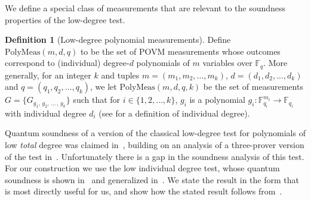 \documentclass[11pt]{article}
\theoremstyle{definition}
\newtheorem{definition}[theorem]{Definition}
\newcommand{\F}{\ensuremath{\mathbb{F}}}
\newcommand{\ldc}{k}
\newcommand{\polymeas}[3]{\mathrm{PolyMeas}(#1,#2,#3)}
\newcommand{\simulpolymeas}[4]{\mathrm{PolyMeas}(#1,#2,#3, #4)}
\begin{document}
We define a special class of measurements that are relevant to the soundness
properties of the low-degree test.

\begin{definition}[Low-degree polynomial measurements]
  \label{def:ld-meas}
  Define $\polymeas{m}{d}{q}$ to be the set of POVM measurements whose outcomes
  correspond to (individual) degree-$d$ polynomials of $m$ variables over
  $\F_q$.
  More generally, for an integer $\ldc$ and tuples $m=(m_1, m_2, \ldots,
  m_\ldc)$, $d=(d_1, d_2, \ldots, d_\ldc)$ and $q=(q_1, q_2, \ldots, q_\ldc)$,
  we let $\simulpolymeas{m}{d}{q}{\ldc}$ be the set of measurements $G =
  \{G_{g_1,\, g_2,\, \ldots\,,\, g_\ldc}\}$ such that for $i\in\{1, 2, \ldots,
  \ldc\}$, $g_i$ is a polynomial $g_i:\F_{q_i}^{m_i} \rightarrow
  \F_{q_i}$ with individual degree $d_i$ (see  for a definition of individual degree). 
\end{definition}

Quantum soundness of a version of the classical low-degree test for polynomials of low \emph{total} degree was claimed
in~\cite{natarajan2018low}, building on an analysis of a three-prover version of the test in~\cite{vidick2016three}. Unfortunately there is a gap in the soundness analysis of this test. For our construction we use the low individual degree test, whose quantum soundness is shown in~\cite{ML20} and generalized in~\cite{ji2021quantum}. We state the result in the form that is most directly useful for us, and show how the stated result follows from~\cite{ji2021quantum}.
\end{document}
